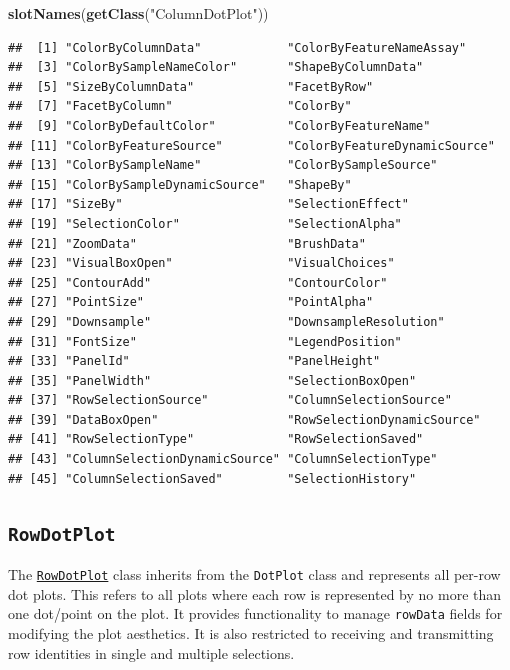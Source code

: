 \documentclass[
]{book}
\newenvironment{Shaded}{\begin{snugshade}}{\end{snugshade}}
\newcommand{\KeywordTok}[1]{\textcolor[rgb]{0.13,0.29,0.53}{\textbf{#1}}}
\newcommand{\NormalTok}[1]{#1}
\newcommand{\StringTok}[1]{\textcolor[rgb]{0.31,0.60,0.02}{#1}}
\begin{document}
\begin{Shaded}
\begin{Highlighting}[]
\KeywordTok{slotNames}\NormalTok{(}\KeywordTok{getClass}\NormalTok{(}\StringTok{"ColumnDotPlot"}\NormalTok{))}
\end{Highlighting}
\end{Shaded}

\begin{verbatim}
##  [1] "ColorByColumnData"            "ColorByFeatureNameAssay"     
##  [3] "ColorBySampleNameColor"       "ShapeByColumnData"           
##  [5] "SizeByColumnData"             "FacetByRow"                  
##  [7] "FacetByColumn"                "ColorBy"                     
##  [9] "ColorByDefaultColor"          "ColorByFeatureName"          
## [11] "ColorByFeatureSource"         "ColorByFeatureDynamicSource" 
## [13] "ColorBySampleName"            "ColorBySampleSource"         
## [15] "ColorBySampleDynamicSource"   "ShapeBy"                     
## [17] "SizeBy"                       "SelectionEffect"             
## [19] "SelectionColor"               "SelectionAlpha"              
## [21] "ZoomData"                     "BrushData"                   
## [23] "VisualBoxOpen"                "VisualChoices"               
## [25] "ContourAdd"                   "ContourColor"                
## [27] "PointSize"                    "PointAlpha"                  
## [29] "Downsample"                   "DownsampleResolution"        
## [31] "FontSize"                     "LegendPosition"              
## [33] "PanelId"                      "PanelHeight"                 
## [35] "PanelWidth"                   "SelectionBoxOpen"            
## [37] "RowSelectionSource"           "ColumnSelectionSource"       
## [39] "DataBoxOpen"                  "RowSelectionDynamicSource"   
## [41] "RowSelectionType"             "RowSelectionSaved"           
## [43] "ColumnSelectionDynamicSource" "ColumnSelectionType"         
## [45] "ColumnSelectionSaved"         "SelectionHistory"
\end{verbatim}

\hypertarget{rowdotplot}{%
\subsection{\texorpdfstring{\texttt{RowDotPlot}}{RowDotPlot}}\label{rowdotplot}}

The \href{https://isee.github.io/iSEE/reference/RowDotPlot-class.html}{\texttt{RowDotPlot}} class inherits from the \texttt{DotPlot} class and represents all per-row dot plots.
This refers to all plots where each row is represented by no more than one dot/point on the plot.
It provides functionality to manage \texttt{rowData} fields for modifying the plot aesthetics.
It is also restricted to receiving and transmitting row identities in single and multiple selections.
\end{document}

